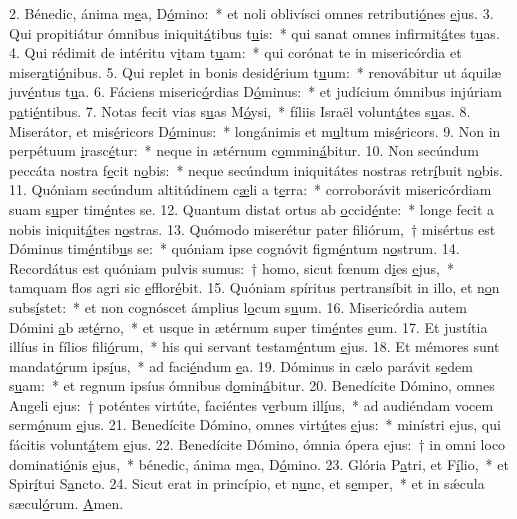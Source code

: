 2. Bénedic, ánima m\uline{e}a, D\uline{ó}mino:~* et noli oblivísci omnes retributi\uline{ó}nes \uline{e}jus.
3. Qui propitiátur ómnibus iniquit\uline{á}tibus t\uline{u}is:~* qui sanat omnes infirmit\uline{á}tes t\uline{u}as.
4. Qui rédimit de intéritu v\uline{i}tam t\uline{u}am:~* qui corónat te in misericórdia et miser\uline{a}ti\uline{ó}nibus.
5. Qui replet in bonis desid\uline{é}rium t\uline{u}um:~* renovábitur ut áquilæ juv\uline{é}ntus t\uline{u}a.
6. Fáciens miseric\uline{ó}rdias D\uline{ó}minus:~* et judícium ómnibus injúriam p\uline{a}ti\uline{é}ntibus.
7. Notas fecit vias s\uline{u}as M\uline{ó}ysi,~* fíliis Israël volunt\uline{á}tes s\uline{u}as.
8. Miserátor, et mis\uline{é}ricors D\uline{ó}minus:~* longánimis et m\uline{u}ltum mis\uline{é}ricors.
9. Non in perpétuum \uline{i}rasc\uline{é}tur:~* neque in ætérnum c\uline{o}mmin\uline{á}bitur.
10. Non secúndum peccáta nostra f\uline{e}cit n\uline{o}bis:~* neque secúndum iniquitátes nostras retr\uline{í}buit n\uline{o}bis.
11. Quóniam secúndum altitúdinem c\uline{æ}li a t\uline{e}rra:~* corroborávit misericórdiam suam s\uline{u}per tim\uline{é}ntes se.
12. Quantum distat ortus ab \uline{o}ccid\uline{é}nte:~* longe fecit a nobis iniquit\uline{á}tes n\uline{o}stras.
13. Quómodo miserétur pater filiórum,~† misértus est Dóminus tim\uline{é}ntib\uline{u}s se:~* quóniam ipse cognóvit figm\uline{é}ntum n\uline{o}strum.
14. Recordátus est quóniam pulvis sumus:~† homo, sicut fœnum d\uline{i}es \uline{e}jus,~* tamquam flos agri sic \uline{e}fflor\uline{é}bit.
15. Quóniam spíritus pertransíbit in illo, et n\uline{o}n subs\uline{í}stet:~* et non cognóscet ámplius l\uline{o}cum s\uline{u}um.
16. Misericórdia autem Dómini \uline{a}b æt\uline{é}rno,~* et usque in ætérnum super tim\uline{é}ntes \uline{e}um.
17. Et justítia illíus in fílios f\uline{i}li\uline{ó}rum,~* his qui servant testam\uline{é}ntum \uline{e}jus.
18. Et mémores sunt mandat\uline{ó}rum ips\uline{í}us,~* ad faci\uline{é}ndum \uline{e}a.
19. Dóminus in cælo parávit s\uline{e}dem s\uline{u}am:~* et regnum ipsíus ómnibus d\uline{o}min\uline{á}bitur.
20. Benedícite Dómino, omnes Angeli ejus:~† poténtes virtúte, faciéntes v\uline{e}rbum ill\uline{í}us,~* ad audiéndam vocem serm\uline{ó}num \uline{e}jus.
21. Benedícite Dómino, omnes virt\uline{ú}tes \uline{e}jus:~* minístri ejus, qui fácitis volunt\uline{á}tem \uline{e}jus.
22. Benedícite Dómino, ómnia ópera ejus:~† in omni loco dominati\uline{ó}nis \uline{e}jus,~* bénedic, ánima m\uline{e}a, D\uline{ó}mino.
23. Glória P\uline{a}tri, et F\uline{í}lio,~* et Spir\uline{í}tui S\uline{a}ncto.
24. Sicut erat in princípio, et n\uline{u}nc, et s\uline{e}mper,~* et in sǽcula sæcul\uline{ó}rum. \uline{A}men.
